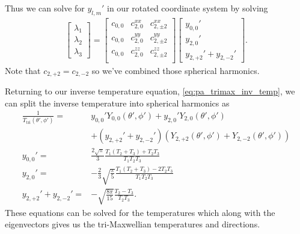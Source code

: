 Thus we can solve for $y_{l,m}'$ in our rotated coordinate system by solving
\begin{align}
    \begin{bmatrix}
        \lambda_1 \\
        \lambda_2 \\
        \lambda_3
    \end{bmatrix} = \begin{bmatrix}
        c_{0,0} & c_{2,0}^{xx} & c_{2,\pm 2}^{xx} \\
        c_{0,0} & c_{2,0}^{yy} & c_{2,\pm 2}^{yy} \\
        c_{0,0} & c_{2,0}^{zz} & c_{2,\pm 2}^{zz} \\
    \end{bmatrix} \begin{bmatrix}
        y_{0,0}' \\
        y_{2,0}' \\
        y_{2,+2}' + y_{2,-2}'
    \end{bmatrix}.
\end{align}
Note that $c_{2,+2} = c_{2,-2}$ so we've combined those spherical harmonics.

Returning to our inverse temperature equation, \ref{eq:pa_trimax_inv_temp}, we can split the inverse temperature into spherical harmonics as
\begin{align*}
    \frac{1}{T_\text{tri}(\theta', \phi')} =& y_{0,0}' Y_{0,0}(\theta', \phi') + y_{2,0}' Y_{2,0}(\theta', \phi') \\
    &+ (y_{2,+2}' + y_{2,-2}') \left(Y_{2,+2}(\theta', \phi') + Y_{2,-2}(\theta', \phi')\right) \\
    y_{0,0}' =& \frac{2\sqrt{\pi}}{3} \frac{T_1 (T_2 + T_3) + T_2 T_3}{T_1 T_2 T_3} \\
    y_{2,0}' =& -\frac{2}{3} \sqrt{\frac{\pi}{5}} \frac{T_1 (T_2 + T_3) - 2 T_2 T_3}{T_1 T_2 T_3} \\
    y_{2,+2}' + y_{2,-2}' =& -\sqrt{\frac{8 \pi}{15}} \frac{T_2 - T_3}{T_2 T_3}.
\end{align*}
These equations can be solved for the temperatures which along with the eigenvectors gives us the tri-Maxwellian temperatures and directions.



